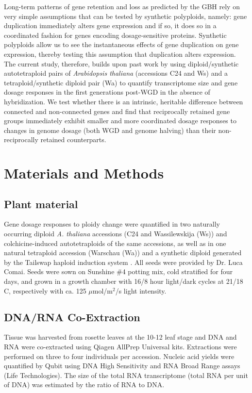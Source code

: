 \documentclass[11pt]{article}
\begin{document}
Long-term patterns of gene retention and loss as predicted by the GBH rely on very simple assumptions that can be tested by synthetic polyploids, namely: gene duplication immediately alters gene expression and if so, it does so in a coordinated fashion for genes encoding dosage-sensitive proteins. Synthetic polyploids allow us to see the instantaneous effects of gene duplication on gene expression, thereby testing this assumption that duplication alters expression. The current study, therefore, builds upon past work by using diploid/synthetic autotetraploid pairs of {\it Arabidopsis thaliana} (accessions C24 and Ws) and a tetraploid/synthetic diploid pair (Wa) to quantify transcriptome size and gene dosage responses in the first generations post-WGD in the absence of hybridization.  We test whether there is an intrinsic, heritable difference between connected and non-connected genes and find that reciprocally retained gene groups immediately exhibit smaller and more coordinated dosage responses to changes in genome dosage (both WGD and genome halving) than their non-reciprocally retained counterparts.

\section*{Materials and Methods}
\subsection*{Plant material}
Gene dosage responses to ploidy change were quantified in two naturally occurring diploid \textit{A. thaliana} accessions (C24 and Wassilewskija (Ws)) and colchicine-induced autotetraploids of the same accessions, as well as in one natural tetraploid accession (Warschau (Wa)) and a synthetic diploid generated by the Tailswap haploid induction system \citep{ravi2010}.
All seeds were provided by Dr. Luca Comai.
Seeds were sown on Sunshine \#4 potting mix, cold stratified for four days, and grown in a growth chamber with 16/8 hour light/dark cycles at 21/18 C, respectively with ca. 125 $\mu$mol/m$^2$/s light intensity.

\subsection*{DNA/RNA Co-Extraction}
Tissue was harvested from rosette leaves at the 10-12 leaf stage and DNA and RNA were co-extracted using Qiagen AllPrep Universal kits.
Extractions were performed on three to four individuals per accession.
Nucleic acid yields were quantified by Qubit using DNA High Sensitivity and RNA Broad Range assays (Life Technologies).
The size of the total RNA transcriptome (total RNA per unit of DNA) was estimated by the ratio of RNA to DNA.
\end{document}
